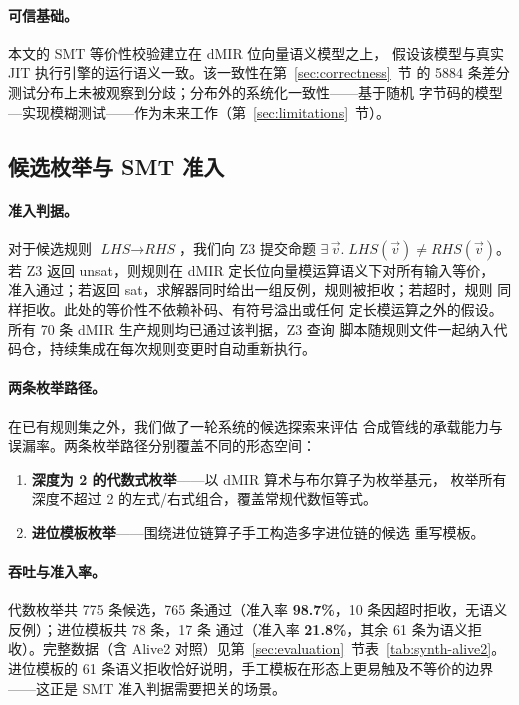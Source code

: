 \paragraph{可信基础。}本文的 SMT 等价性校验建立在 dMIR 位向量语义模型之上，
假设该模型与真实 JIT 执行引擎的运行语义一致。该一致性在第~\ref{sec:correctness}~节
的 5884 条差分测试分布上未被观察到分歧；分布外的系统化一致性——基于随机
字节码的模型—实现模糊测试——作为未来工作（第~\ref{sec:limitations}~节）。

\subsection{候选枚举与 SMT 准入}
\label{sec:synthesis}

\paragraph{准入判据。}对于候选规则 $\textit{LHS} \to \textit{RHS}$，我们向
Z3 提交命题
$\exists\,\vec{v}.\;\textit{LHS}(\vec{v}) \neq \textit{RHS}(\vec{v})$。
若 Z3 返回 unsat，则规则在 dMIR 定长位向量模运算语义下对所有输入等价，
准入通过；若返回 sat，求解器同时给出一组反例，规则被拒收；若超时，规则
同样拒收。此处的等价性不依赖补码、有符号溢出或任何
定长模运算之外的假设。所有 70 条 dMIR 生产规则均已通过该判据，Z3 查询
脚本随规则文件一起纳入代码仓，持续集成在每次规则变更时自动重新执行。

\paragraph{两条枚举路径。}在已有规则集之外，我们做了一轮系统的候选探索来评估
合成管线的承载能力与误漏率。两条枚举路径分别覆盖不同的形态空间：
\begin{enumerate}
  \item \textbf{深度为 2 的代数式枚举}——以 dMIR 算术与布尔算子为枚举基元，
    枚举所有深度不超过 2 的左式/右式组合，覆盖常规代数恒等式。
  \item \textbf{进位模板枚举}——围绕进位链算子手工构造多字进位链的候选
    重写模板。
\end{enumerate}

\paragraph{吞吐与准入率。}代数枚举共 775 条候选，765 条通过（准入率
\textbf{98.7\%}，10 条因超时拒收，无语义反例）；进位模板共 78 条，17 条
通过（准入率 \textbf{21.8\%}，其余 61 条为语义拒收）。完整数据（含 Alive2
对照）见第~\ref{sec:evaluation}~节表~\ref{tab:synth-alive2}。进位模板的
61 条语义拒收恰好说明，手工模板在形态上更易触及不等价的边界——这正是
SMT 准入判据需要把关的场景。

